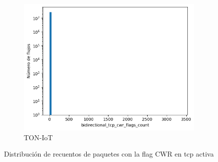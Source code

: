 \begin{figure}[H]
    \begin{subfigure}[b]{0.32\textwidth}
        \centering
        \includegraphics[width=\linewidth]{media/packet_pincer_toniot/bidirectional_tcp_cwr_flags_count_linear_x_log_y.png}
        \caption{TON-IoT}
    \end{subfigure}
       \caption{Distribución de recuentos de paquetes con la flag CWR en \acrshort{tcp} activa}
       \label{fig:packet_pincer_bidirectional_tcp_cwr_flags_count}
\end{figure}

